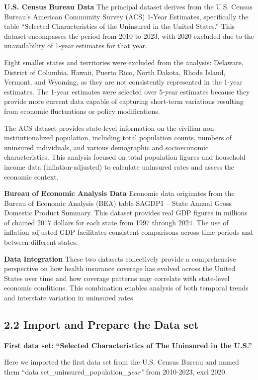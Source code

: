 \documentclass[
]{article}
\begin{document}
\textbf{U.S. Census Bureau Data} The principal dataset derives from the
U.S. Census Bureau's American Community Survey (ACS) 1-Year Estimates,
specifically the table ``Selected Characteristics of the Uninsured in
the United States.'' This dataset encompasses the period from 2010 to
2023, with 2020 excluded due to the unavailability of 1-year estimates
for that year.

Eight smaller states and territories were excluded from the analysis:
Delaware, District of Columbia, Hawaii, Puerto Rico, North Dakota, Rhode
Island, Vermont, and Wyoming, as they are not consistently represented
in the 1-year estimates. The 1-year estimates were selected over 5-year
estimates because they provide more current data capable of capturing
short-term variations resulting from economic fluctuations or policy
modifications.

The ACS dataset provides state-level information on the civilian
non-institutionalized population, including total population counts,
numbers of uninsured individuals, and various demographic and
socioeconomic characteristics. This analysis focused on total population
figures and household income data (inflation-adjusted) to calculate
uninsured rates and assess the economic context.

\textbf{Bureau of Economic Analysis Data} Economic data originates from
the Bureau of Economic Analysis (BEA) table SAGDP1 -- State Annual Gross
Domestic Product Summary. This dataset provides real GDP figures in
millions of chained 2017 dollars for each state from 1997 through 2024.
The use of inflation-adjusted GDP facilitates consistent comparisons
across time periods and between different states.

\textbf{Data Integration} These two datasets collectively provide a
comprehensive perspective on how health insurance coverage has evolved
across the United States over time and how coverage patterns may
correlate with state-level economic conditions. This combination enables
analysis of both temporal trends and interstate variation in uninsured
rates.

\subsection{2.2 Import and Prepare the Data
set}\label{import-and-prepare-the-data-set}

\textbf{First data set:} \textbf{``Selected Characteristics of The
Uninsured in the U.S.''}

Here we imported the first data set from the U.S. Census Bureau and
named them ``data set\_uninsured\_population\_\emph{year''} from
2010-2023, excl 2020.
\end{document}
